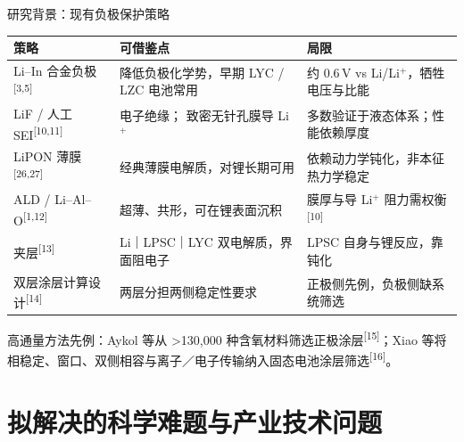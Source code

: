 \documentclass[aspectratio=169,10pt]{beamer}
\renewcommand{\cite}[1]{\textsuperscript{\color{NJUMuted}[#1]}}
\newenvironment{decktable}
  {\par\fontsize{8.3}{10.8}\selectfont\renewcommand{\arraystretch}{1.22}}
  {\par}
\begin{document}
\begin{frame}[t]{研究背景：现有负极保护策略}
\begin{decktable}
\begin{tabular}{@{}L{.22\textwidth}L{.37\textwidth}L{.33\textwidth}@{}}
  \toprule
  策略 & 可借鉴点 & 局限 \\
  \midrule
  Li–In 合金负极\cite{3,5} & 降低负极化学势，早期 LYC / LZC 电池常用 & 约 0.6\,V vs Li/Li$^+$，牺牲电压与比能 \\
  LiF /  人工 SEI\cite{10,11} & 电子绝缘； 致密无针孔膜导 Li$^+$ & 多数验证于液态体系；性能依赖厚度 \\
  LiPON 薄膜\cite{26,27} & 经典薄膜电解质，对锂长期可用 & 依赖动力学钝化，非本征热力学稳定 \\
  ALD  / Li–Al–O\cite{1,12} & 超薄、共形，可在锂表面沉积 & 膜厚与导 Li$^+$ 阻力需权衡\cite{10} \\
   夹层\cite{13} & Li｜LPSC｜LYC 双电解质，界面阻电子 & LPSC 自身与锂反应，靠钝化 \\
  双层涂层计算设计\cite{14} & 两层分担两侧稳定性要求 & 正极侧先例，负极侧缺系统筛选 \\
  \bottomrule
\end{tabular}
\end{decktable}

高通量方法先例：Aykol 等从 >130{,}000 种含氧材料筛选正极涂层\cite{15}；Xiao 等将相稳定、窗口、双侧相容与离子／电子传输纳入固态电池涂层筛选\cite{16}。
\end{frame}

\section{拟解决的科学难题与产业技术问题}
\end{document}
